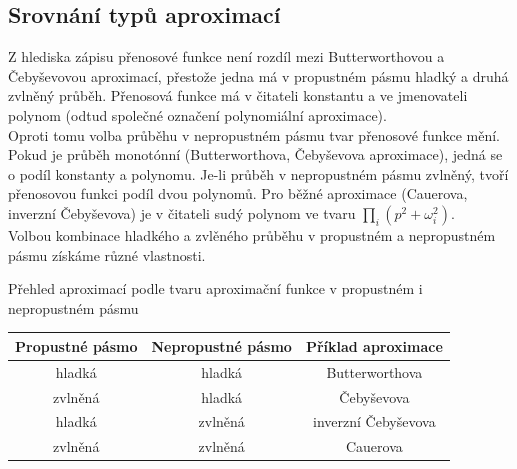 \subsection{Srovnání typů aproximací}
Z hlediska zápisu přenosové funkce není rozdíl mezi Butterworthovou a Čebyševovou aproximací, přestože jedna má v propustném pásmu hladký a druhá zvlněný průběh. Přenosová funkce má v čitateli konstantu a ve jmenovateli polynom (odtud společné označení polynomiální aproximace).\\
Oproti tomu volba průběhu v nepropustném pásmu tvar přenosové funkce mění. Pokud je průběh monotónní (Butterworthova, Čebyševova aproximace), jedná se o podíl konstanty a polynomu. Je-li průběh v nepropustném pásmu zvlněný, tvoří přenosovou funkci podíl dvou polynomů. Pro běžné aproximace (Cauerova, inverzní Čebyševova) je v čitateli sudý polynom ve tvaru $\prod _{i} (p^2 + \omega_i^2)$.\\
Volbou kombinace hladkého a zvlěného průběhu v propustném a nepropustném pásmu získáme různé vlastnosti.\\
 \begin{table}[h]
 \caption[Přehled aproximací podle tvaru aproximační funkce v propustném i nepropustném pásmu]{\label{tab:Přehled aproximací podle tvaru aproximační funkce v propustném i nepropustném pásmu}Přehled aproximací podle tvaru aproximační funkce v propustném i nepropustném pásmu \cite{3}}
  \end{table}
\begin{center}
\begin{table}[h]
\centering
  \begin{tabular}{ | c | c | c | }
    \hline
    Propustné pásmo & Nepropustné pásmo & Příklad aproximace \\ \hline
    hladká & hladká & Butterworthova \\ \hline
    zvlněná & hladká & Čebyševova \\ \hline
    hladká & zvlněná & inverzní Čebyševova \\ \hline
    zvlněná & zvlněná & Cauerova \\ \hline
  \end{tabular}
   \end{table}
   \end{center}